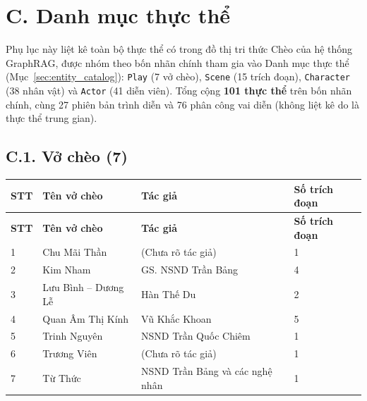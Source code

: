 %

\section*{C. Danh mục thực thể}
\label{appendix:entity_catalog}

Phụ lục này liệt kê toàn bộ thực thể có trong đồ thị tri thức Chèo của hệ thống GraphRAG, được nhóm theo bốn nhãn chính tham gia vào Danh mục thực thể (Mục~\ref{sec:entity_catalog}): \texttt{Play} (7 vở chèo), \texttt{Scene} (15 trích đoạn), \texttt{Character} (38 nhân vật) và \texttt{Actor} (41 diễn viên). Tổng cộng \textbf{101 thực thể} trên bốn nhãn chính, cùng 27 phiên bản trình diễn và 76 phân công vai diễn (không liệt kê do là thực thể trung gian).

\subsection*{C.1. Vở chèo (7)}

\begin{longtable}{|p{0.8cm}|p{4.8cm}|p{6.6cm}|p{1.6cm}|}
  \hline
  \textbf{STT} & \textbf{Tên vở chèo} & \textbf{Tác giả} & \textbf{Số trích đoạn} \\
  \hline
  \endfirsthead
  \hline
  \textbf{STT} & \textbf{Tên vở chèo} & \textbf{Tác giả} & \textbf{Số trích đoạn} \\
  \hline
  \endhead
  \hline
  \endfoot

  1 & Chu Mãi Thần          & (Chưa rõ tác giả)                     & 1 \\ \hline
  2 & Kim Nham              & GS. NSND Trần Bảng                    & 4 \\ \hline
  3 & Lưu Bình -- Dương Lễ  & Hàn Thế Du                            & 2 \\ \hline
  4 & Quan Âm Thị Kính      & Vũ Khắc Khoan                         & 5 \\ \hline
  5 & Trinh Nguyên          & NSND Trần Quốc Chiêm                  & 1 \\ \hline
  6 & Trương Viên           & (Chưa rõ tác giả)                     & 1 \\ \hline
  7 & Từ Thức               & NSND Trần Bảng và các nghệ nhân       & 1 \\ \hline
\end{longtable}

